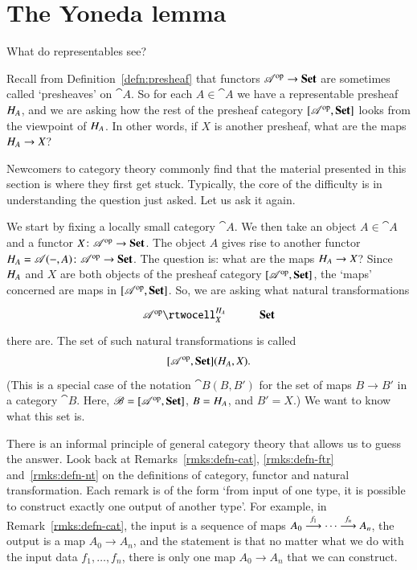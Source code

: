 \section{The Yoneda lemma}


What do representables see?

Recall from Definition~\ref{defn:presheaf} that functors $\mathscr{A}^{\mathrm{op}} \to
\mathbf{Set}$ are sometimes called `presheaves' on $\cat{A}$.  So for each $A \in
\cat{A}$ we have a representable presheaf $H_A$, and we are asking how the
rest of the presheaf category $[\mathscr{A}^{\mathrm{op}},\mathbf{Set}]$ looks from the viewpoint of
$H_A$.  In other words, if $X$ is another presheaf, what are the maps
$H_A \to X$?

Newcomers to category theory commonly find that the material presented in
this section is where they first get stuck.  Typically, the core of the
difficulty is in understanding the question just asked.  Let us ask it
again.

We start by fixing a locally small category $\cat{A}$.  We then take an
object $A \in \cat{A}$ and a functor $X\from \cat{A}^\op \to \Set$.  The
object $A$ gives rise to another functor $\h_A = \cat{A}(\dashbk, A)\from
\cat{A}^\op \to \Set$.  The question is: what are the maps $H_A \to X$?
Since $H_A$ and $X$ are both objects of the presheaf category
$[\mathscr{A}^{\mathrm{op}},\mathbf{Set}]$, the `maps' concerned are maps in $[\mathscr{A}^{\mathrm{op}},\mathbf{Set}]$.  So,
we are asking what natural transformations
%
\begin{equation}
\label{eq:yoneda-transf}
\begin{array}{c}
\xymatrix{
\cat{A}^\op \rtwocell^{\h_A}_{X} &\Set
}
\end{array}
\end{equation}
%
there are.  The set of such natural transformations is called
\[
[\mathscr{A}^{\mathrm{op}},\mathbf{Set}](H_A, X).
\]
(This is a special case of the notation $\cat{B}(B, B')$ for the set of
maps $B \to B'$ in a category $\cat{B}$.  Here, $\mathscr{B} = [\mathscr{A}^{\mathrm{op}},\mathbf{Set}]$,
$B = H_A$, and $B' = X$.)  We want to know what this set is.

There is an informal principle%
%
%
of general category theory that allows us to
guess the answer.  Look back at
Remarks~\ref{rmks:defn-cat},
\ref{rmks:defn-ftr}
and~\ref{rmks:defn-nt} on the definitions of
category, functor and natural transformation.  Each remark is of the form
`from input of one type, it is possible to construct exactly one output of
another type'.  For example, in
Remark~\ref{rmks:defn-cat}, the input is a
sequence of maps $A_0 \stackrel{f_1}{\longrightarrow} \cdots \stackrel{f_n}{\longrightarrow} A_n$, the output is a
map $A_0 \to A_n$, and the statement is that no matter what we do with the
input data $f_1, \ldots, f_n$, there is only one map $A_0 \to A_n$ that we
can construct.

